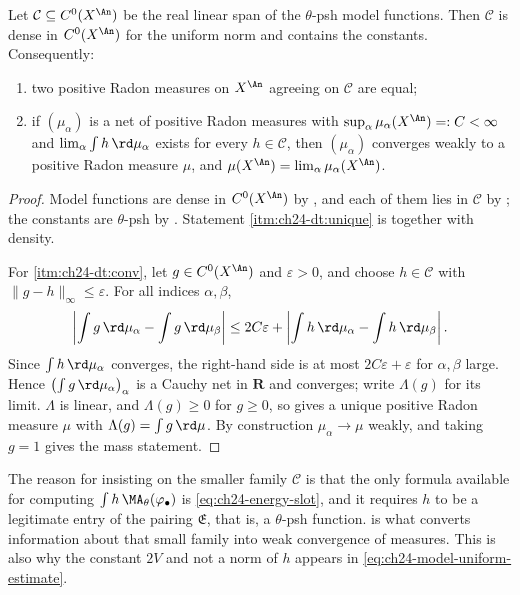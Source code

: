 \begin{lemma}
\label{lem:ch24-dense-tests}
Let \(\mathcal C\subseteq C^0(X^{\An})\) be the real linear span of the
\(\theta\)-psh model functions.  Then \(\mathcal C\) is dense in
\(C^0(X^{\An})\) for the uniform norm and contains the constants.
Consequently:
\begin{enumerate}
\item\label{itm:ch24-dt:unique} two positive Radon measures on \(X^{\An}\)
 agreeing on \(\mathcal C\) are equal;
\item\label{itm:ch24-dt:conv} if \((\mu_\alpha)\) is a net of positive Radon
 measures with \(\sup_\alpha\mu_\alpha(X^{\An})=:C<\infty\) and
 \(\lim_\alpha\int h\,\rd\mu_\alpha\) exists for every
 \(h\in\mathcal C\), then \((\mu_\alpha)\) converges weakly to a positive
 Radon measure \(\mu\), and \(\mu(X^{\An})=\lim_\alpha\mu_\alpha(X^{\An})\).
\end{enumerate}
\end{lemma}

\begin{proof}
Model functions are dense in \(C^0(X^{\An})\) by
, and each of them lies in
\(\mathcal C\) by ; the constants are
\(\theta\)-psh by .  Statement
\cref{itm:ch24-dt:unique} is  together with
density.

For \cref{itm:ch24-dt:conv}, let \(g\in C^0(X^{\An})\) and
\(\varepsilon>0\), and choose \(h\in\mathcal C\) with
\(\|g-h\|_\infty\leq\varepsilon\).  For all indices \(\alpha,\beta\),
\[
 \left|\int g\,\rd\mu_\alpha-\int g\,\rd\mu_\beta\right|
 \leq 2C\varepsilon
 +\left|\int h\,\rd\mu_\alpha-\int h\,\rd\mu_\beta\right| .
\]
Since \(\int h\,\rd\mu_\alpha\) converges, the right-hand side is at most
\(2C\varepsilon+\varepsilon\) for \(\alpha,\beta\) large.  Hence
\(\bigl(\int g\,\rd\mu_\alpha\bigr)_\alpha\) is a Cauchy net in \(\mathbf R\)
and converges; write \(\Lambda(g)\) for its limit.  \(\Lambda\) is linear,
and \(\Lambda(g)\geq0\) for \(g\geq0\), so  gives a
unique positive Radon measure \(\mu\) with \(\Lambda(g)=\int g\,\rd\mu\).
By construction \(\mu_\alpha\to\mu\) weakly, and taking \(g=1\) gives the
mass statement.
\end{proof}

\begin{remark}
\label{rem:ch24-why-psh-tests}
The reason for insisting on the smaller family \(\mathcal C\) is that the
only formula available for computing \(\int h\,\MA_\theta(\varphi_\bullet)\)
is \eqref{eq:ch24-energy-slot}, and it requires \(h\) to be a legitimate
entry of the pairing \(\mathfrak E\), that is, a \(\theta\)-psh function.
 is what converts information about that small
family into weak convergence of measures.  This is also why the constant
\(2V\) and not a norm of \(h\) appears in
\eqref{eq:ch24-model-uniform-estimate}.
\end{remark}


